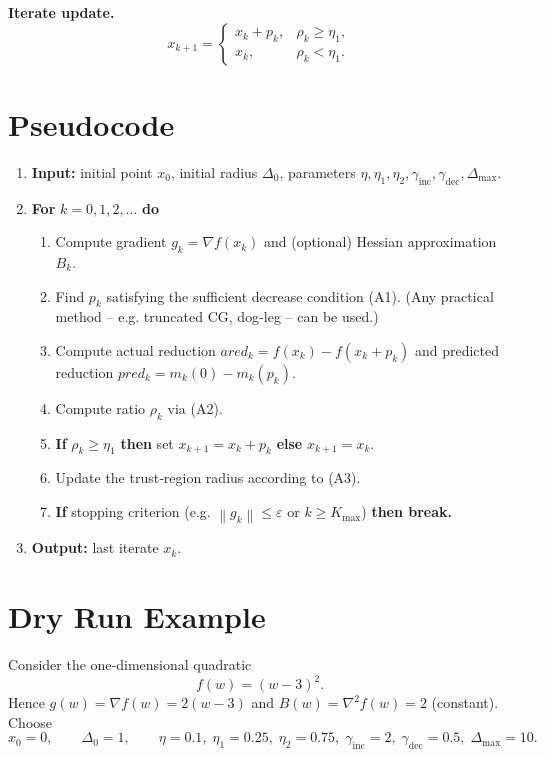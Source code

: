 \documentclass[11pt]{article}
\newcommand{\norm}[1]{\left\lVert#1\right\rVert}
\begin{document}
\noindent\textbf{Iterate update.}
\[
x_{k+1}= 
\begin{cases}
x_k+p_k , & \rho_k\ge \eta_1,\\[4pt]
x_k , & \rho_k<\eta_1 .
\end{cases}
\tag{A4}
\]

\section*{Pseudocode}
\begin{enumerate}[label=Step \arabic*:,leftmargin=*,itemsep=0.3em]
\item \textbf{Input:} initial point $x_0$, initial radius $\Delta_0$, parameters 
$\eta,\eta_1,\eta_2,\gamma_{\text{inc}},\gamma_{\text{dec}},\Delta_{\max}$.
\item \textbf{For} $k=0,1,2,\dots$ \textbf{do}
\begin{enumerate}[label= \arabic*.,leftmargin=*,itemsep=0.2em]
\item Compute gradient $g_k=\nabla f(x_k)$ and (optional) Hessian approximation $B_k$.
\item Find $p_k$ satisfying the sufficient decrease condition (A1).  
(Any practical method – e.g. truncated CG, dog‑leg – can be used.)
\item Compute actual reduction $ared_k=f(x_k)-f(x_k+p_k)$ and predicted reduction $pred_k=m_k(0)-m_k(p_k)$.
\item Compute ratio $\rho_k$ via (A2).
\item \textbf{If} $\rho_k\ge \eta_1$ \textbf{then} set $x_{k+1}=x_k+p_k$ \textbf{else} $x_{k+1}=x_k$.
\item Update the trust‑region radius according to (A3).
\item \textbf{If} stopping criterion (e.g. $\norm{g_k}\le \varepsilon$ or $k\ge K_{\max}$) \textbf{then break.}
\end{enumerate}
\item \textbf{Output:} last iterate $x_{k}$.
\end{enumerate}

\section*{Dry Run Example}
Consider the one‑dimensional quadratic
\[
f(w)=(w-3)^2 .
\]
Hence $g(w)=\nabla f(w)=2(w-3)$ and $B(w)=\nabla^2 f(w)=2$ (constant).  
Choose
\[
x_0=0,\qquad \Delta_0=1,\qquad 
\eta=0.1,\;\eta_1=0.25,\;\eta_2=0.75,\;
\gamma_{\text{inc}}=2,\;\gamma_{\text{dec}}=0.5,\;
\Delta_{\max}=10 .
\]
\end{document}
